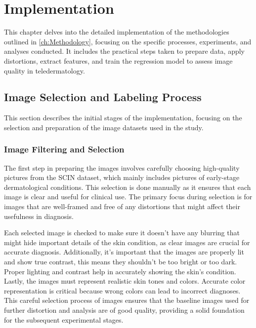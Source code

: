 \chapter{Implementation}
\label{ch:Implementation}
This chapter delves into the detailed implementation of the methodologies outlined in \autoref{ch:Methodology}, focusing on the specific processes, experiments, and analyses conducted. It includes the practical steps taken to prepare data, apply distortions, extract features, and train the regression model to assess image quality in teledermatology.

\section{Image Selection and Labeling Process}
\label{sec:ImgSelectLabel}
This section describes the initial stages of the implementation, focusing on the selection and preparation of the image datasets used in the study. \par
\vspace{\baselineskip}
\noindent

\subsection{Image Filtering and Selection}
\label{sub:ImgFilterSelect}
The first step in preparing the images involves carefully choosing high-quality pictures from the SCIN dataset, which mainly includes pictures of early-stage dermatological conditions. This selection is done manually as it ensures that each image is clear and useful for clinical use. The primary focus during selection is for images that are well-framed and free of any distortions that might affect their usefulness in diagnosis.\par
\vspace{\baselineskip}
\noindent
Each selected image is checked to make sure it doesn't have any blurring that might hide important details of the skin condition, as clear images are crucial for accurate diagnosis. Additionally, it's important that the images are properly lit and show true contrast, this means they shouldn't be too bright or too dark. Proper lighting and contrast help in accurately showing the skin's condition. Lastly, the images must represent realistic skin tones and colors. Accurate color representation is critical because wrong colors can lead to incorrect diagnoses. This careful selection process of images ensures that the baseline images used for further distortion and analysis are of good quality, providing a solid foundation for the subsequent experimental stages. \par



